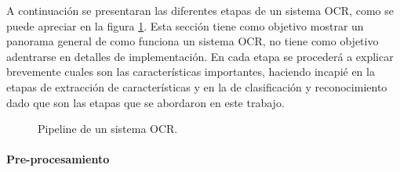 	A continuación se presentaran las diferentes etapas de un sistema OCR, como se puede apreciar en la figura \ref{fig: Sistema OCR}. Esta sección tiene como objetivo mostrar un panorama general de como funciona un sistema OCR, no tiene como objetivo adentrarse en detalles de implementación. En cada etapa se procederá a explicar brevemente cuales son las características importantes, haciendo incapié en la etapas de extracción de características y en la de clasificación y reconocimiento dado que son las etapas que se abordaron en este trabajo.
	
		\begin{figure}[htbp]
			\centering
			\caption{Pipeline de un sistema OCR.}
			\label{fig: Sistema OCR}
		\end{figure}
	
		\paragraph{Pre-procesamiento} ~\\

